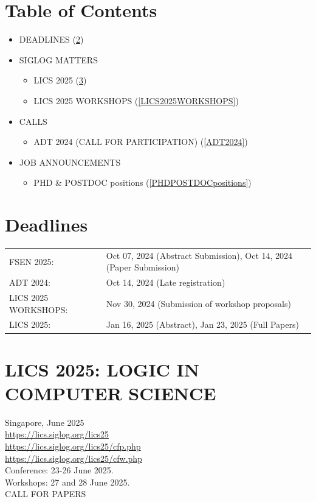 \documentclass[prodmode,acmtecs]{acmsmall} %
\begin{document}
\section{Table of Contents}\begin{itemize}\item DEADLINES (\cref{deadlines}) 
 
\item SIGLOG MATTERS 
 
\begin{itemize}\item LICS 2025 (\cref{LICS2025})
\item LICS 2025 WORKSHOPS (\cref{LICS2025WORKSHOPS})
\end{itemize} 
\item CALLS 
 
\begin{itemize}\item ADT 2024 (CALL FOR PARTICIPATION) (\cref{ADT2024})
\end{itemize} 
\item JOB ANNOUNCEMENTS 
 
\begin{itemize}\item PHD \& POSTDOC positions (\cref{PHDPOSTDOCpositions})
\end{itemize} 
\end{itemize}\section{Deadlines}\label{deadlines}\begin{tabulary}{\linewidth}{LL}FSEN 2025:  & Oct 07, 2024 (Abstract Submission), Oct 14, 2024 (Paper Submission) \\
ADT 2024:  & Oct 14, 2024 (Late registration) \\
LICS 2025 WORKSHOPS:  & Nov 30, 2024 (Submission of workshop proposals) \\
LICS 2025:  & Jan 16, 2025 (Abstract), Jan 23, 2025 (Full Papers) \\
\end{tabulary}
\section{LICS 2025: LOGIC IN COMPUTER SCIENCE  }\label{LICS2025}  Singapore, June 2025\\ 
  \href{https://lics.siglog.org/lics25}{https://lics.siglog.org/lics25}\\ 
  \href{https://lics.siglog.org/lics25/cfp.php}{https://lics.siglog.org/lics25/cfp.php}\\ 
  \href{https://lics.siglog.org/lics25/cfw.php}{https://lics.siglog.org/lics25/cfw.php}\\ 
  Conference: 23-26 June 2025.\\ 
  Workshops: 27 and 28 June 2025.\\ 
CALL FOR PAPERS 
\end{document}

